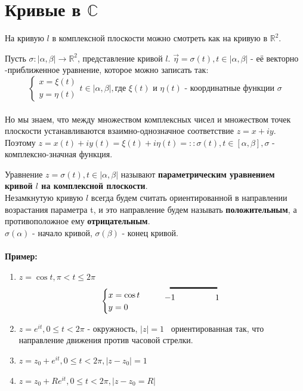 \documentclass[a4paper, 12pt]{report}
\begin{document}
\section{ Кривые в $\mathbb{C}$}
На кривую $l$ в комплексной плоскости можно смотреть как на кривую в $\mathbb{R}^2$.
\par
Пусть $\sigma: |\alpha, \beta| \to \mathbb{R}^2 $, представление кривой $l$.
 $\vec\eta = \sigma(t), t \in |\alpha, \beta|$ - её векторно -приближенное уравнение, которое можно записать так:
\begin{equation*}
 \begin{cases}
   x = \xi(t)
\\
	y = \eta(t)
 \end{cases}
t \in |\alpha, \beta|, \text {где $\xi(t)$ и $\eta(t)$ - координатные функции $\sigma$}
\end{equation*}
\\ Но мы знаем, что между множеством комплексных чисел и множеством точек плоскости устанавливаются взаимно-однозначное соответствие $z = x + iy$.
\\Поэтому $z = x(t) + iy(t) = \xi(t) + i\eta(t) = :: \sigma(t), t \in [\alpha, \beta], \sigma$ -  комплексно-значная функция.
\par\bigskip
Уравнение $z=\sigma(t), t \in |\alpha, \beta|$ называют \textbf{параметрическим уравнением кривой $l$ на комплексной плоскости}.
\\Незамкнутую кривую $l$ всегда будем считать ориентированной в направлении возрастания параметра t, и это направление будем называть \textbf{положительным}, а противоположное ему \textbf{отрицательным}. 
\\ $\sigma(\alpha)$ - начало кривой, $\sigma(\beta)$ - конец кривой.
\\ \\ \textbf{Пример: } 
\begin{enumerate}
    \item $z = \cos t, \pi < t \leq 2\pi$
    \begin {equation*}
	\begin{cases}
	x =\cos t \\
	y = 0
	\end{cases}
	\ \ \ \ 
\begin{tikzpicture}
\draw[ultra thick, black] (-1,0) -- node[shift = {(-1, -0.4)}]{$-1$} (1, 0) -- node[shift = {(0, -0.4)}]{$1$} (1,0);
\end{tikzpicture}
\end{equation*}
\item $z = e^{it}, 0 \leq t < 2\pi$ - окружность,  $|z|=1$ \ ориентированная так, что направление движения против часовой стрелки.
\item $z = z_0 + e^{it}, 0 \leq t < 2\pi, |z - z_0| = 1$
\item $z = z_0 + Re^{it}, 0\leq t < 2\pi, |z- z_0 = R|$
\end{enumerate}
\end{document}
